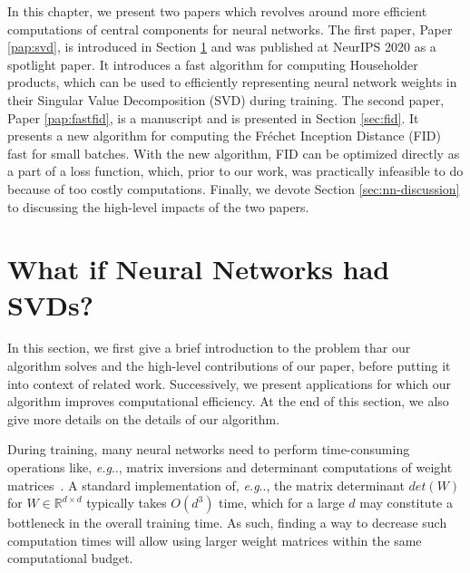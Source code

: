 \documentclass[11pt,a4paper,twoside,openright,final]{memoir}
\makeatletter
\DeclareRobustCommand\onedot{\futurelet\@let@token\@onedot}
\def\@onedot{\ifx\@let@token.\else.\null\fi\xspace}
\def\eg{\emph{e.g}\onedot} \def\Eg{\emph{E.g}\onedot}
\newcommand\contribution[1]{\hspace{0.5em}\hyperref[#1]{\ding{81}}}
\newcommand*{\paperref}[1]{Paper \hyperref[#1]{\ref{#1}}}
\makeatother
\begin{document}
In this chapter, we present two papers which revolves around more efficient computations of central components for neural networks.
The first paper, \paperref{pap:svd}, is introduced in Section \ref{sec:svd} and was published at NeurIPS 2020 as a spotlight paper.
It introduces a fast algorithm for computing Householder products, which can be used to efficiently representing neural network weights in their Singular Value Decomposition (SVD) during training.
The second paper, \paperref{pap:fastfid}, is a manuscript and is presented in Section \ref{sec:fid}. 
It presents a new algorithm for computing the Fr\'echet Inception Distance (FID) fast for small batches.
With the new algorithm, FID can be optimized directly as a part of a loss function, which, prior to our work, was practically infeasible to do because of too costly computations. 
Finally, we devote Section \ref{sec:nn-discussion} to discussing the high-level impacts of the two papers. 

\section{What if Neural Networks had SVDs?\contribution{pap:svd}} \label{sec:svd}
In this section, we first give a brief introduction to the problem thar our algorithm solves and the high-level contributions of our paper, before putting it into context of related work. Successively, we present applications for which our algorithm improves computational efficiency.
At the end of this section, we also give more details on the details of our algorithm.

During training, many neural networks need to perform time-consuming operations like, \eg, matrix inversions and determinant computations of weight matrices~\cite{nice, realnvp, glow}.
A standard implementation of, \eg, the matrix determinant $det(W)$ for $W\in\mathbb{R}^{d\times d}$ typically takes $O(d^3)$ time, which for a large $d$ may constitute a bottleneck in the overall training time. 
As such, finding a way to decrease such computation times will allow using larger weight matrices within the same computational budget.
\end{document}
